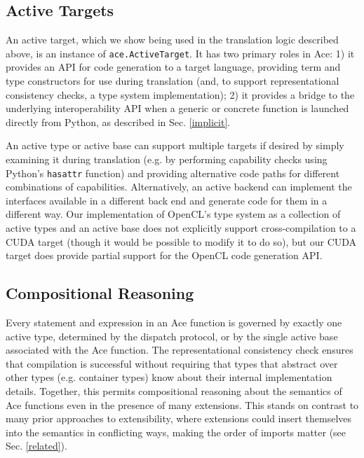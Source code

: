 \documentclass[9pt,preprint]{sigplanconf}
\begin{document}
\subsection{Active Targets}\label{atargets}
An active target, which we show being used in the translation logic described above, is an instance of \verb|ace.ActiveTarget|. It has two primary roles in Ace: 1) it provides an API for code generation to a target language, providing term and type constructors for use during translation (and, to support representational consistency checks, a type system implementation); 2) it provides a bridge to the underlying interoperability API when a generic or concrete function is launched directly from Python, as described in Sec. \ref{implicit}.

An active type or active base can support multiple targets if desired by simply examining it during translation (e.g. by performing capability checks using Python's \verb|hasattr| function) and providing alternative code paths for different combinations of capabilities. Alternatively, an active backend can implement the interfaces available in a different back end and generate code for them in a different way. Our implementation of OpenCL's type system as a collection of active types and an active base does not explicitly support cross-compilation to a CUDA target (though it would be possible to modify it to do so), but our CUDA target does provide partial support for the OpenCL code generation API.


\subsection{Compositional Reasoning}\label{safety}
Every statement and expression in an Ace function is governed by exactly one active type, determined by the dispatch protocol, or by the single active base associated with the Ace function. The representational consistency check ensures that compilation is successful without requiring that types that abstract over other types (e.g. container types) know about their internal implementation details. Together, this permits compositional reasoning about the semantics of Ace functions even in the presence of many extensions. This stands on contrast to many prior approaches to extensibility, where extensions could insert themselves into the semantics in conflicting ways, making the order of imports matter (see Sec. \ref{related}). 
\end{document}
